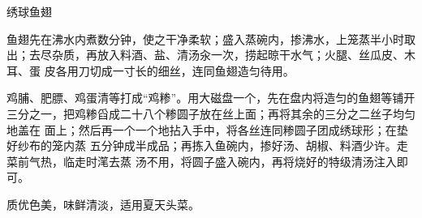 %
%
%
%
%
%
%
\begin{recipe}{绣球鱼翅}

\ingredients


\preparation

\step 鱼翅先在沸水内煮数分钟，使之干净柔软；盛入蒸碗内，掺沸水，上笼蒸半小时取
出；去尽杂质，再放入料酒、盐、清汤汆一次，捞起晾干水气；火腿、丝瓜皮、木耳、蛋
皮各用刀切成一寸长的细丝，连同鱼翅造匀待用。

\step 鸡脯、肥膘、鸡蛋清等打成“鸡糁”。用大磁盘一个，先在盘内将造匀的鱼翅等铺开
三分之一，把鸡糁舀成二十八个糁圆子放在丝上面；再将其余的三分之二丝子均匀地盖在
面上；然后再一个一个地拈入手中，将各丝连同糁圆子团成绣球形；在垫好纱布的笼内蒸
五分钟成半成品；再拣入鱼碗内，掺好汤、胡椒、料酒少许。走菜前气热，临走时滗去蒸
汤不用，将圆子盛入碗内，再将烧好的特级清汤注入即可。

\features

质优色美，味鲜清淡，适用夏天头菜。

\end{recipe}

